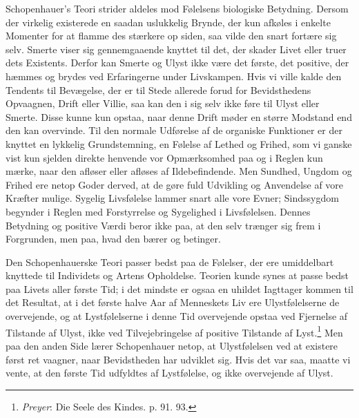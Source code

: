 \documentclass[12pt,a4paper,openany]{book}
\newcommand{\opage}[1]{\marginnote{\footnotesize\textit{[#1]}}}
\begin{document}
Schopenhauer’s Teori strider aldeles mod Følelsens biologiske Betydning.
Dersom der virkelig existerede en saadan uslukkelig Brynde, der kun
afkøles i enkelte Momenter for at flamme des stærkere op siden, saa
vilde den snart fortære sig selv. Smerte viser sig gennemgaaende knyttet
til det, der skader Livet eller truer dets Existents. Derfor kan Smerte
og Ulyst ikke være det første, det positive, der hæmmes og brydes ved
Erfaringerne under Livskampen. Hvis vi ville kalde den Tendents til
Bevægelse, der er til Stede allerede forud for Bevidsthedens Opvaagnen,
Drift eller Villie, saa kan den i sig selv ikke føre til Ulyst eller
Smerte. Disse kunne kun opstaa, naar denne Drift møder en større
Modstand end den kan overvinde. Til den normale Udførelse af de
organiske Funktioner er der knyttet en lykkelig Grundstemning, en
Følelse af Lethed og Frihed, som vi ganske vist kun sjelden direkte
henvende vor Opmærksomhed paa og i Reglen kun mærke, naar den afløser
eller afløses af Ildebefindende. Men Sundhed, Ungdom og Frihed ere netop
Goder derved, at de gøre fuld Udvikling og Anvendelse af vore Kræfter
mulige. Sygelig Livsfølelse lammer snart alle vore Evner; Sindssygdom
begynder i Reglen med Forstyrrelse og Sygelighed i Livsfølelsen. Dennes
Betydning og positive Værdi beror ikke paa, at den selv trænger sig frem
i Forgrunden, men paa, hvad den bærer og betinger.

Den Schopenhauerske Teori passer bedst paa de Følelser, der ere
umiddelbart knyttede til Individets og Artens Opholdelse. Teorien kunde
synes at passe bedst paa Livets aller første Tid; i det mindste er ogsaa
en uhildet Iagttager kommen til det Resultat, at i det første halve Aar
af Menneskets Liv ere Ulystfølelserne de overvejende, og at
Lystfølelserne i denne Tid overvejende opstaa ved Fjernelse af Tilstande
af Ulyst, ikke ved Tilvejebringelse af positive Tilstande af
Lyst.\footnote[1]{\emph{Preyer}: Die Seele des Kindes. p. 91. 93.} Men
paa den anden Side lærer Schopenhauer netop, at Ulystfølelsen
\opage{338}ved at existere først ret vaagner, naar Bevidstheden har
udviklet sig. Hvis det var saa, maatte vi vente, at den første Tid
udfyldtes af Lystfølelse, og ikke overvejende af Ulyst.
\end{document}
